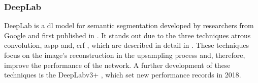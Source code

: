 \subsubsection{DeepLab}
DeepLab is a \gls{dl} model for semantic segmentation developed by researchers from Google and first published in \cite{Chen16-DeepLab}.
It stands out due to the three techniques atrous convolution, \gls{aspp} \cite{He15-SPP} and, \gls{crf} \cite{KK12-CRF}, which are described in detail in \cite{Chen16-DeepLab}.
These techniques focus on the image's reconstruction in the upsampling process and, therefore, improve the performance of the network.
A further development of these techniques is the DeepLabv3+ \cite{Chen18-DeepLab3+}, which set new performance records in 2018.

	


